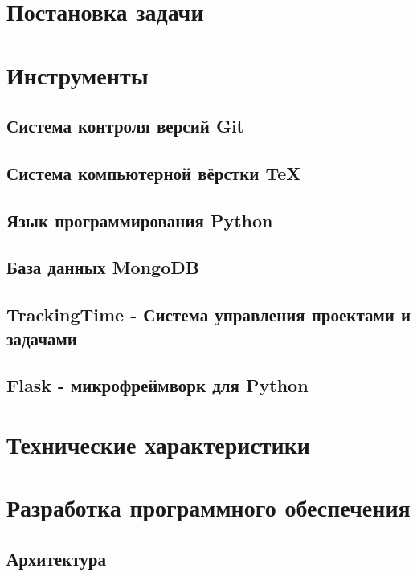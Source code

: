 \section{Постановка задачи}
\setcounter{figure}{0}

\section{Инструменты}
\setcounter{figure}{0}
\subsection{Система контроля версий Git}

\subsection{Система компьютерной вёрстки \TeX}

\subsection{Язык программирования Python}

\subsection{База данных MongoDB}

\subsection{TrackingTime - Система управления проектами и задачами}

\subsection{Flask - микрофреймворк для Python}


\newpage
\section{Технические характеристики}


\section{Разработка программного обеспечения}
\setcounter{figure}{0}
 
\subsection{Архитектура}


